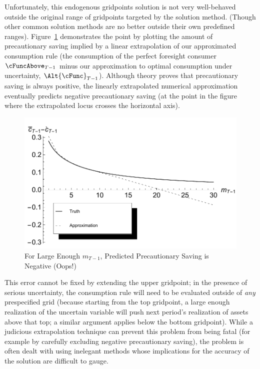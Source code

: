
  Unfortunately, this endogenous gridpoints solution is not very
  well-behaved outside the original range of gridpoints targeted by
  the solution method.  (Though other common solution methods are no
  better outside their own predefined ranges).
  Figure~\ref{fig:ExtrapProblem} demonstrates the point by plotting
  the amount of precautionary saving implied by a linear extrapolation
  of our approximated consumption rule (the consumption of the perfect
  foresight consumer $\cFuncAbove_{T-1}$ minus our approximation to
  optimal consumption under uncertainty, $\Alt{\cFunc}_{T-1}$).
  Although theory proves that precautionary saving is always positive,
  the linearly extrapolated numerical approximation eventually
  predicts negative precautionary saving (at the point in the figure
  where the extrapolated locus crosses the horizontal axis).

\hypertarget{ExtrapProblemPlot}{}
\begin{figure}
        \includegraphics{./Figures/ExtrapProblemPlot}
        \caption{For Large Enough ${m}_{T-1}$, Predicted Precautionary Saving is Negative (Oops!)}
        \label{fig:ExtrapProblem}
\end{figure}

This error cannot be fixed by extending the upper gridpoint; in the
presence of serious uncertainty, the consumption rule will need to be
evaluated outside of \textit{any} prespecified grid (because starting
from the top gridpoint, a large enough realization of the uncertain
variable will push next period's realization of assets above that
top; a similar argument applies below the bottom gridpoint).  While a judicious extrapolation technique can prevent this
problem from being fatal (for example by carefully excluding negative
precautionary saving), the problem is often dealt with using inelegant
methods whose implications for the accuracy of the solution are
difficult to gauge.
